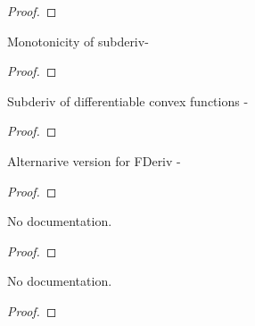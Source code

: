 \begin{proof}
    \leanok
\end{proof}

\begin{theorem}\label{subgradientAt_mono}
        \leanok
                Monotonicity of subderiv-
    \end{theorem}

\begin{proof}
    \leanok
\end{proof}

\begin{theorem}\label{SubderivWithinAt_eq_gradient}
        \leanok
                Subderiv of differentiable convex functions -
    \end{theorem}

\begin{proof}
    \leanok
\end{proof}

\begin{theorem}\label{SubderivWithinAt_eq_FDeriv}
        \leanok
                Alternarive version for FDeriv -
    \end{theorem}

\begin{proof}
    \leanok
\end{proof}

\begin{theorem}\label{SubderivAt_eq_gradient}
        \leanok
                No documentation.
    \end{theorem}

\begin{proof}
    \leanok
\end{proof}

\begin{theorem}\label{HasSubgradientAt_zero_of_isMinOn}
        \leanok
                No documentation.
    \end{theorem}

\begin{proof}
    \leanok
\end{proof}

